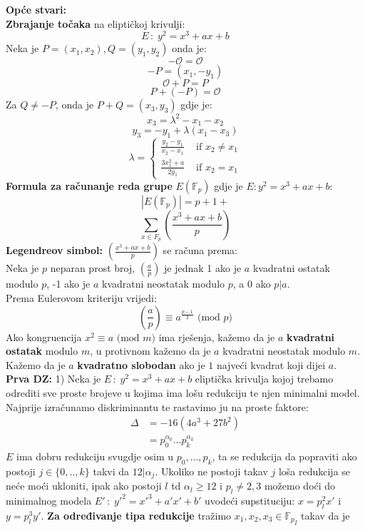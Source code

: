 \documentclass[12pt, a4paper]{article}
\begin{document}
\begin{multicols}{3}
\noindent 
\scriptsize
\textbf{Opće stvari:\\}
\textbf{Zbrajanje točaka} na eliptičkoj krivulji: \[E \, : \; y^2=x^3+ax+b\] Neka je $P=(x_1, x_2), Q=(y_1,y_2)$ onda je:
\[-\mathcal{O}=\mathcal{O}\]
\[-P=(x_1,-y_1)\]
\[\mathcal{O} + P=P\]
\[P+(-P)=\mathcal{O}\]
Za $Q \neq -P$, onda je $P+Q=(x_3,y_3)$ gdje je:
\[x_3=\lambda ^2-x_1-x_2\]\[y_3=-y_1+\lambda (x_1-x_3)\]
\[\lambda=\begin{cases}\frac{y_2-y_1}{x_2-x_1} &\mbox{ if } x_2 \neq x_1 \\ \frac{3x_1^2+a}{2y_1} &\mbox{ if } x_2=x_1 \end{cases}\]
\textbf{Formula za računanje reda grupe} $E(\mathbb{F}_p)$ gdje je $E: y^2=x^3+ax+b$:
\[|E(\mathbb{F}_p)|=p+1+\]\[\sum_{x \in F_p} \left(\frac{x^3+ax+b}{p}\right)\]
\textbf{Legendreov simbol:} $\left(\frac{x^3+ax+b}{p}\right)$ se računa prema:\\
Neka je $p$ neparan prost broj, $\left(\frac{a}{p}\right)$ je jednak 1 ako je $a$ kvadratni ostatak modulo $p$, -1 ako je $a$ kvadratni neostatak modulo $p$, a $0$ ako $p|a$.\\
Prema Eulerovom kriteriju vrijedi:
\[\left(\frac{a}{p}\right)\equiv a^{\frac{p-1}{2}} \textrm{ (mod } p)\]
Ako kongruencija $x^2\equiv a \textrm{ (mod }m) $ ima rješenja, kažemo da je $a$ \textbf{kvadratni ostatak} modulo $m$, u protivnom kažemo da je $a$ kvadratni neostatak modulo $m$.\\
Kažemo da je $a$ \textbf{kvadratno slobodan} ako je $1$ najveći kvadrat koji dijei $a$.\\[0.5cm]
\textbf{Prva DZ:} 1) Neka je $E \, : \; y^2=x^3+ax+b$ eliptička krivulja kojoj trebamo odrediti sve proste brojeve u kojima ima lošu redukciju te njen minimalni model. Najprije izračunamo diskriminantu te rastavimo ju na proste faktore: 
\begin{align}
\label{eq: diskrim}
\Delta&=-16(4a^3+27b^2)\\
&=p_0^{\alpha_0}...p_k^{\alpha_k}
\end{align}
$E$ ima dobru redukciju svugdje osim u $p_0,...,p_k$, ta se redukcija da popraviti ako postoji $j \in \{0,..,k\}$ takvi da $12|\alpha_j$. Ukoliko ne postoji takav $j$ loša redukcija se neće moći ukloniti, ipak ako postoji $l$ td $\alpha_l \geq 12$ i $p_l\neq 2,3$ možemo doći do minimalnog modela $E' \, : \; y'^2=x'^3+a'x'+b'$ uvodeći supstituciju: $x=p_l ^2x'$ i $y=p_l ^3 y'$. \textbf{Za određivanje tipa redukcije} tražimo $x_1, x_2, x_3 \in {\mathbb{F}_p}_l$ takav da je 

\end{multicols}
\end{document}
